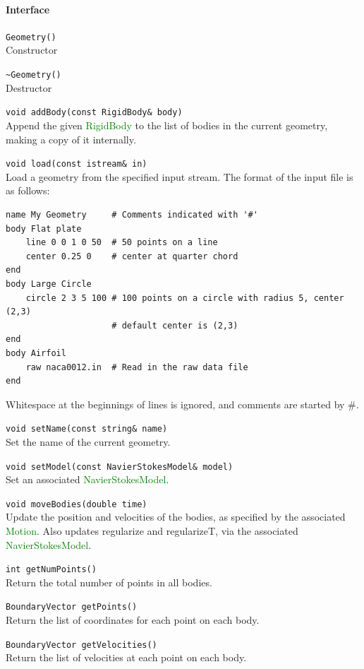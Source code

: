 \documentclass[11pt]{article}
\def\class#1{\textcolor{green}{\ttfamily\small #1}} %
\def\fn#1{{\ttfamily\small #1}} %
\let\code\lstinline
\begin{document}
\paragraph{Interface}
\begin{description}
	\item \code|Geometry()| \\
		Constructor
	\item \code|~Geometry()| \\
		Destructor
	\item \code|void addBody(const RigidBody& body)| \\
		Append the given \class{RigidBody} to the list of bodies in the current geometry, making a copy of it internally.
	\item \code|void load(const istream& in)| \\
		Load a geometry from the specified input stream.  The format of the input file is as follows:
\begin{verbatim}
name My Geometry     # Comments indicated with '#'
body Flat plate
    line 0 0 1 0 50  # 50 points on a line
    center 0.25 0    # center at quarter chord
end
body Large Circle
    circle 2 3 5 100 # 100 points on a circle with radius 5, center (2,3)
                     # default center is (2,3)
end
body Airfoil
    raw naca0012.in  # Read in the raw data file
end
\end{verbatim}
	 Whitespace at the beginnings of lines is ignored, and comments are started by \#.
	\item \code|void setName(const string& name)| \\
		Set the name of the current geometry.
	\item \code|void setModel(const NavierStokesModel& model)| \\
		Set an associated \class{NavierStokesModel}.
	\item \code|void moveBodies(double time)| \\
		Update the position and velocities of the bodies, as specified by the associated \class{Motion}.  Also updates \fn{regularize} and \fn{regularizeT}, via the associated \class{NavierStokesModel}.
	\item \code|int getNumPoints()| \\
		Return the total number of points in all bodies.
	\item \code|BoundaryVector getPoints()| \\
		Return the list of coordinates for each point on each body.
	\item \code|BoundaryVector getVelocities()| \\
		Return the list of velocities at each point on each body.		
\end{description}
\end{document}
